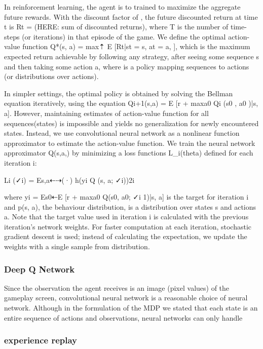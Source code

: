 \documentclass{article}
\begin{document}
\begin{multicols}{2}
In reinforcement learning, the agent is to trained to maximize the aggregate future rewards. With the discount factor of \gamma, the future discounted return at time t is Rt = (HERE: sum of discounted returns), where T is the number of time-steps (or iterations) in that episode of the game. We define the optimal action-value function Q*(s, a) = max⇡ E [Rt|st = s, at = a, \pi], which is the maximum expected return achievable by following any strategy, after seeing some sequence s and then taking some action a, where \pi is a policy mapping sequences to actions (or distributions over actions).

In simpler settings, the optimal policy is obtained by solving the Bellman equation iteratively, using the equation Qi+1(s,a) = E [r +   maxa0 Qi (s0 , a0 )|s, a]. However, maintaining estimates of action-value function for all sequences(states) is impossible and yields no generalization for newly encountered states. Instead, we use convolutional neural network as a nonlinear function approximator to estimate the action-value function. We train the neural network approximator Q(s,a,\theta) by minimizing a loss functions L_i(theta) defined for each iteration i:

Li (✓i) = Es,a⇠⇢(·) h(yi   Q (s, a; ✓i))2i

where yi = Es0⇠E [r +   maxa0 Q(s0, a0; ✓i 1)|s, a] is the target for iteration i and p(s, a), the behaviour distribution, is a distribution over states s and actions a. Note that the target value used in iteration i is calculated with the previous iteration's network weights. For faster computation at each iteration, stochastic gradient descent is used; instead of calculating the expectation, we update the weights with a single sample from distribution. 

\subsubsection{Deep Q Network}

Since the observation the agent receives is an image (pixel values) of the gameplay screen, convolutional neural network is a reasonable choice of neural network. Although in the formulation of the MDP we stated that each state is an entire sequence of actions and observations, neural networks can only handle  

\subsubsection{experience replay}


\end{multicols}
\end{document}
